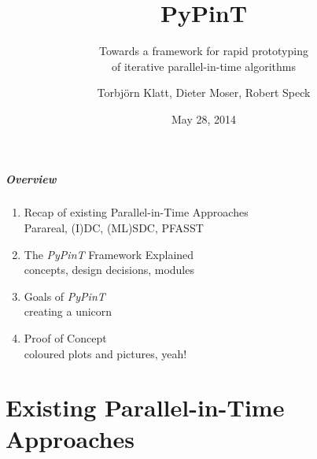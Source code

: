 \documentclass[%
  english,
  hyperref={pdfpagelabels=false},
  aspectratio=1610]{beamer}
\title{PyPinT}
\subtitle{Towards a framework for rapid prototyping\\of iterative parallel-in-time algorithms}
\author{Torbjörn Klatt, Dieter Moser, Robert Speck}
\institute{3rd Workshop on Parallel-in-Time Integration}
\date{May 28, 2014}
\begin{document}
\maketitle

\begin{frame}
  \frametitle{Overview}
  \begin{enumerate}
    \item Recap of existing Parallel-in-Time Approaches\\
      {\scriptsize Parareal, (I)DC, (ML)SDC, PFASST}\\[1em]
    \item The \emph{PyPinT} Framework Explained\\
      {\scriptsize concepts, design decisions, modules}\\[1em]
    \item Goals of \emph{PyPinT}\\
      {\scriptsize creating a unicorn}\\[1em]
    \item Proof of Concept\\
      {\scriptsize coloured plots and pictures, yeah!}
  \end{enumerate}
\end{frame}


\part{Existing Parallel-in-Time Approaches}
\makepart
\end{document}
